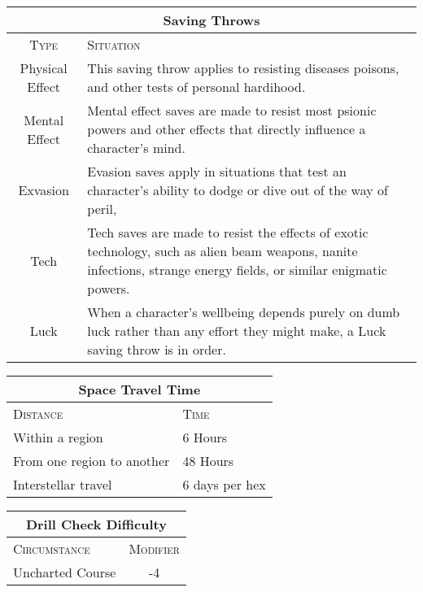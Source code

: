 \documentclass[10pt,letterpaper]{article}
\begin{document}
\begin{multicols}{3}
    \hspace{-1cm} %
    \begin{tabularx}{\columnwidth}{ | c | X | }
        \hline
        \multicolumn{2}{|c|}{\textbf{Saving Throws}} \\
        \hline
        \textsc{Type} & \textsc{Situation} \\
        \hline
        Physical Effect & This saving throw applies to resisting diseases poisons, and other tests of personal hardihood.\\
        \hline
        Mental Effect & Mental effect saves are made to resist most psionic powers and other effects that directly influence a character’s mind.\\
        \hline
        Exvasion & Evasion saves apply in situations that test an character’s ability to dodge or dive out of the way of peril,\\
        \hline
        Tech & Tech saves are made to resist the effects of exotic technology, such as alien beam weapons, nanite infections, strange energy fields, or similar enigmatic powers.\\
        \hline
        Luck & When a character’s wellbeing depends purely on dumb luck rather than any effort they might make, a Luck saving throw is in order.\\
        \hline
    \end{tabularx}
    \begin{tabularx}{\columnwidth}{ | l | X | }
        \hline
        \multicolumn{2}{|c|}{\textbf{Space Travel Time}} \\
        \hline
        \textsc{Distance} & \textsc{Time} \\
        \hline
        Within a region & 6 Hours \\
        \hline
        From one region to another & 48 Hours \\
        \hline
        Interstellar travel & 6 days per hex \\
        \hline
    \end{tabularx}
    \begin{tabularx}{\columnwidth}{ | X | c | }
        \hline
        \multicolumn{2}{|c|}{\textbf{Drill Check Difficulty}} \\
        \hline
        \textsc{ Circumstance} & \textsc{Modifier} \\
        \hline
        Uncharted Course & -4 \\

\end{tabularx}
\end{multicols}
\end{document}
